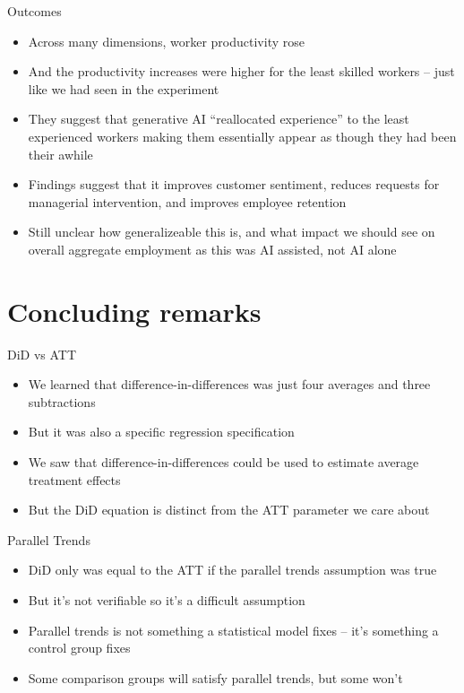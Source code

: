 \documentclass{beamer}
\begin{document}
\begin{frame}{Outcomes}

\begin{itemize}

\item Across many dimensions, worker productivity rose
\item And the productivity increases were higher for the least skilled workers -- just like we had seen in the experiment
\item They suggest that generative AI ``reallocated experience'' to the least experienced workers making them essentially appear as though they had been their awhile
\item Findings suggest that it improves customer sentiment, reduces requests for managerial intervention, and improves employee retention
\item Still unclear how generalizeable this is, and what impact we should see on overall aggregate employment as this was AI assisted, not AI alone

\end{itemize}

\end{frame}


\section{Concluding remarks}



\begin{frame}{DiD vs ATT}

\begin{itemize}

\item We learned that difference-in-differences was just four averages and three subtractions
\item But it was also a specific regression specification
\item We saw that difference-in-differences could be used to estimate average treatment effects 
\item But the DiD equation is distinct from the ATT parameter we care about

\end{itemize}

\end{frame}


\begin{frame}{Parallel Trends}

\begin{itemize}

\item DiD only was equal to the ATT if the parallel trends assumption was true
\item But it's not verifiable so it's a difficult assumption
\item Parallel trends is not something a statistical model fixes -- it's something a control group fixes
\item Some comparison groups will satisfy parallel trends, but some won't

\end{itemize}

\end{frame}
\end{document}
